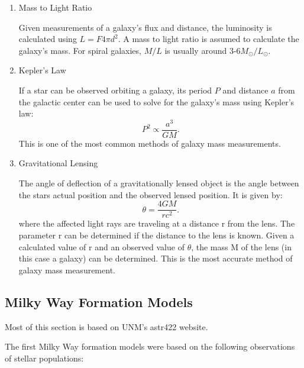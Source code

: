 \begin{enumerate}
\item Mass to Light Ratio

Given measurements of a galaxy's flux and distance, the luminosity is calculated using $L=F 4\pi d^2$. A mass to light ratio is assumed to calculate the galaxy's mass. For spiral galaxies, $M/L$ is usually around 3-6$M_\odot/L_\odot$.

\item Kepler's Law

If a star can be observed orbiting a galaxy, its period $P$ and distance $a$ from the galactic center can be used to solve for the galaxy's mass using Kepler's law:
\begin{equation}
P^2 \propto \frac{a^3}{GM}.
\end{equation}
This is one of the most common methods of galaxy mass measurements. 

\item Gravitational Lensing

The angle of deflection of a gravitationally lensed object is the angle between the stars actual position and the observed lensed position. It is given by:
\begin{equation}
\theta = \frac{4GM}{rc^2}.
\end{equation}
where the affected light rays are traveling at a distance r from the lens. The parameter r can be determined if the distance to the lens is known. Given a calculated value of r and an observed value of $\theta$, the mass M of the lens (in this case a galaxy) can be determined. This is the most accurate method of galaxy mass measurement.

\end{enumerate}

\subsection{Milky Way Formation Models}

Most of this section is based on UNM's astr422 website.

The first Milky Way formation models were based on the following observations of stellar populations:

